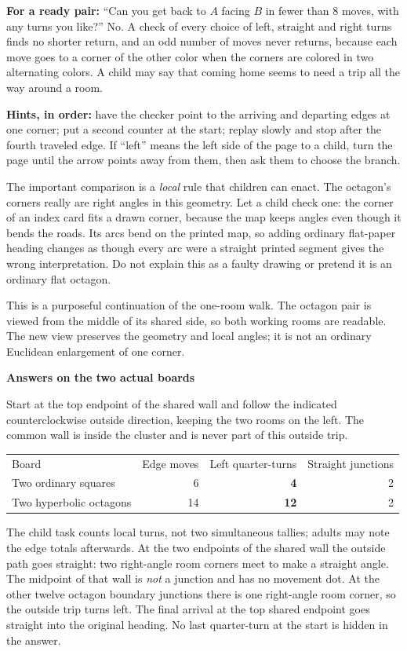 \documentclass[11pt]{article}
\newcommand{\topic}[1]{\vspace{4pt}{\large\bfseries #1}\par}
\newcommand{\sub}[1]{{\bfseries #1}\par}
\begin{document}
\textbf{For a ready pair:} ``Can you get back to \(A\) facing \(B\) in fewer than 8 moves, with any turns you like?'' No. A check of every choice of left, straight and right turns finds no shorter return, and an odd number of moves never returns, because each move goes to a corner of the other color when the corners are colored in two alternating colors. A child may say that coming home seems to need a trip all the way around a room.

\textbf{Hints, in order:} have the checker point to the arriving and departing edges at one corner; put a second counter at the start; replay slowly and stop after the fourth traveled edge. If ``left'' means the left side of the page to a child, turn the page until the arrow points away from them, then ask them to choose the branch.

The important comparison is a \emph{local} rule that children can enact. The octagon's corners really are right angles in this geometry. Let a child check one: the corner of an index card fits a drawn corner, because the map keeps angles even though it bends the roads. Its arcs bend on the printed map, so adding ordinary flat-paper heading changes as though every arc were a straight printed segment gives the wrong interpretation. Do not explain this as a faulty drawing or pretend it is an ordinary flat octagon.
\newpage

\topic{Problem 3: outside two rooms}
This is a purposeful continuation of the one-room walk. The octagon pair is viewed from the middle of its shared side, so both working rooms are readable. The new view preserves the geometry and local angles; it is not an ordinary Euclidean enlargement of one corner.

\sub{Answers on the two actual boards}
Start at the top endpoint of the shared wall and follow the indicated counterclockwise outside direction, keeping the two rooms on the left. The common wall is inside the cluster and is never part of this outside trip.
\begin{center}
\begin{tabular}{lrrr}
Board & Edge moves & Left quarter-turns & Straight junctions \\
Two ordinary squares & 6 & \textbf{4} & 2 \\
Two hyperbolic octagons & 14 & \textbf{12} & 2
\end{tabular}
\end{center}
The child task counts local turns, not two simultaneous tallies; adults may note the edge totals afterwards. At the two endpoints of the shared wall the outside path goes straight: two right-angle room corners meet to make a straight angle. The midpoint of that wall is \emph{not} a junction and has no movement dot. At the other twelve octagon boundary junctions there is one right-angle room corner, so the outside trip turns left. The final arrival at the top shared endpoint goes straight into the original heading. No last quarter-turn at the start is hidden in the answer.
\end{document}
